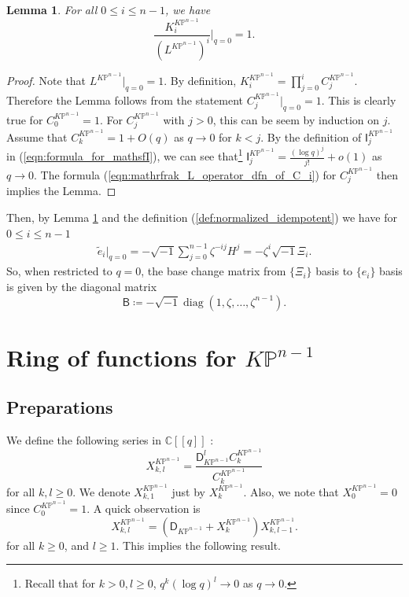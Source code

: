 \documentclass[12pt]{amsart}
\newtheorem{lem}[prop]{Lemma}
\numberwithin{equation}{section}
\newcommand{\KP}{K\mathbb{P}}
\DeclareMathOperator{\diag}{diag}
\begin{document}
\begin{lem}\label{lem:K_over_L_q_0}
For all $0\leq{i}\leq{n-1}$, we have
\begin{equation*}
\frac{K^{\KP^{n-1}}_i}{(L^{\KP^{n-1}})^i}\Big\vert_{q=0}=1.
\end{equation*}
\end{lem}

\begin{proof}
Note that $L^{\KP^{n-1}}|_{q=0}=1$. By definition, $K_i^{\KP^{n-1}}=\prod_{j=0}^{i}C_j^{\KP^{n-1}}$. Therefore the Lemma follows from the statement $C_j^{\KP^{n-1}}|_{q=0}=1$. This is clearly true for $C_0^{\KP^{n-1}}=1$. For $C_j^{\KP^{n-1}}$ with $j>0$, this can be seem by induction on $j$. Assume that $C_k^{\KP^{n-1}}=1+O(q)$ as $q\to 0$ for $k<j$. By the definition of $\mathsf{I}_j^{\KP^{n-1}}$ in (\ref{eqn:formula_for_mathsfI}), we can see that\footnote{Recall that for $k>0, l\geq 0$, $q^k(\log q)^l\to 0$ as $q\to 0$.} $\mathsf{I}_j^{\KP^{n-1}}=\frac{(\log q)^j}{j!}+o(1)$ as $q\to 0$. The formula (\ref{eqn:mathrfrak_L_operator_dfn_of_C_i}) for $C_j^{\KP^{n-1}}$ then implies the Lemma.  
\end{proof}

Then, by Lemma \ref{lem:K_over_L_q_0} and the definition (\ref{def:normalized_idempotent}) we have for $0\leq{i}\leq n-1$
\begin{equation*}
\begin{split}
\widetilde{e}_i\big\vert_{q=0}
=-\sqrt{-1}\sum_{j=0}^{n-1}\zeta^{-i{j}}H^j 
=-\zeta^i\sqrt{-1}\Xi_i.
\end{split}
\end{equation*}
So, when restricted to $q=0$, the base change matrix from $\{\Xi_i\}$ basis to $\{e_i\}$ basis is given by the diagonal matrix
\begin{equation*}
\mathsf{B}\coloneqq -\sqrt{-1}\diag\left(1,\zeta,\ldots,\zeta^{n-1}\right).
\end{equation*}



\section{Ring of functions for \texorpdfstring{$\KP^{n-1}$}{KP{n-1}}}\label{sec:ringKP}

\subsection{Preparations}
We define the following series in $\mathbb{C}[\![q]\!]$ :
\begin{equation*}
X^{\KP^{n-1}}_{k,l}=\frac{\mathsf{D}_{\KP^{n-1}}^lC^{\KP^{n-1}}_k}{C^{\KP^{n-1}}_k}
\end{equation*}
for all $k,l\geq{0}$. We denote $X^{\KP^{n-1}}_{k,1}$ just by $X^{\KP^{n-1}}_k$. Also, we note that $X^{\KP^{n-1}}_0=0$ since $C^{\KP^{n-1}}_0=1$. A quick observation is
\begin{equation*}
X^{\KP^{n-1}}_{k,l}=\left(\mathsf{D}_{\KP^{n-1}}+X^{\KP^{n-1}}_k\right)X^{\KP^{n-1}}_{k,l-1}.
\end{equation*}
for all $k \geq 0$, and $l \geq 1$. This implies the following result.
\end{document}
